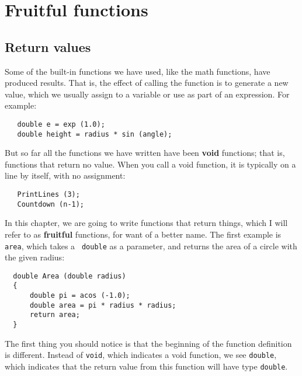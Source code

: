 

\chapter{Fruitful functions}

\section{Return values}

Some of the built-in functions we have used, like the math
functions, have produced results.  That is, the effect of
calling the function is to generate a new value, which we
usually assign to a variable or use as part of an expression.
For example:


\begin{verbatim}
   double e = exp (1.0);
   double height = radius * sin (angle);
\end{verbatim}
%
But so far all the functions we have written have been {\bf void}
functions; that is, functions that return no value.  When you call
a void function, it is typically on a line by itself, with
no assignment:

\begin{verbatim}
   PrintLines (3);
   Countdown (n-1);
\end{verbatim}
%
In this chapter, we are going to write functions that return things,
which I will refer to as {\bf fruitful} functions, for want of a
better name.  The first example is {\tt area}, which takes a {\tt
double} as a parameter, and returns the area of a circle with the
given radius:


\begin{verbatim}
  double Area (double radius) 
  {
      double pi = acos (-1.0);
      double area = pi * radius * radius;
      return area;
  }
\end{verbatim}
%
The first thing you should notice is that the beginning of the
function definition is different.  Instead of {\tt void}, which
indicates a void function, we see {\tt double}, which indicates that
the return value from this function will have type {\tt double}.

